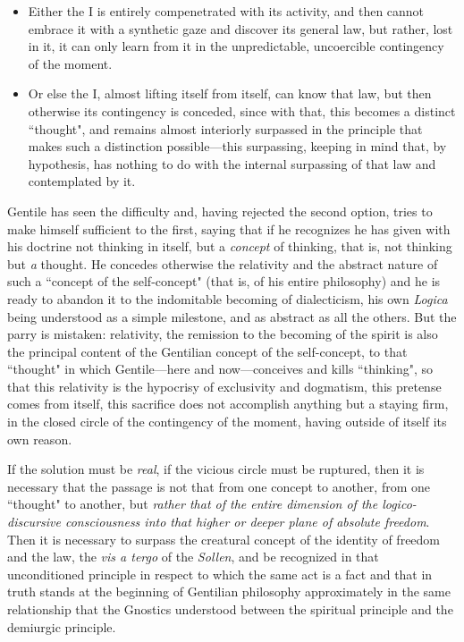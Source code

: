\begin{itemize}
\item Either the I is entirely compenetrated with its activity, and then cannot embrace it with a synthetic gaze and discover its general law, but rather, lost in it, it can only learn from it in the unpredictable, uncoercible contingency of the moment. 
\item Or else the I, almost lifting itself from itself, can know that law, but then otherwise its contingency is conceded, since with that, this becomes a distinct ``thought", and remains almost interiorly surpassed in the principle that makes such a distinction possible—this surpassing, keeping in mind that, by hypothesis, has nothing to do with the internal surpassing of that law and contemplated by it. 
\end{itemize}
Gentile has seen the difficulty and, having rejected the second option, tries to make himself sufficient to the first, saying that if he recognizes he has given with his doctrine not thinking in itself, but a \emph{concept} of thinking, that is, not thinking but \emph{a} thought. He concedes otherwise the relativity and the abstract nature of such a ``concept of the self-concept" (that is, of his entire philosophy) and he is ready to abandon it to the indomitable becoming of dialecticism, his own \emph{Logica} being understood as a simple milestone, and as abstract as all the others. But the parry is mistaken: relativity, the remission to the becoming of the spirit is also the principal content of the Gentilian concept of the self-concept, to that ``thought" in which Gentile—here and now—conceives and kills ``thinking", so that this relativity is the hypocrisy of exclusivity and dogmatism, this pretense comes from itself, this sacrifice does not accomplish anything but a staying firm, in the closed circle of the contingency of the moment, having outside of itself its own reason.

If the solution must be \emph{real}, if the vicious circle must be ruptured, then it is necessary that the passage is not that from one concept to another, from one ``thought" to another, but \emph{rather that of the entire dimension of the logico-discursive consciousness into that higher or deeper plane of absolute freedom}. Then it is necessary to surpass the creatural concept of the identity of freedom and the law, the \emph{vis a tergo} of the \emph{Sollen}, and be recognized in that unconditioned principle in respect to which the same act is a fact and that in truth stands at the beginning of Gentilian philosophy approximately in the same relationship that the Gnostics understood between the spiritual principle and the demiurgic principle.

